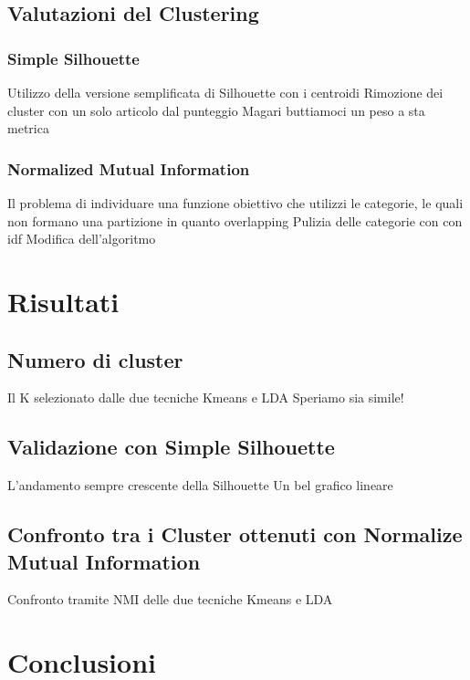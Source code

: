 \documentclass[
12pt, %
a4paper, %
oneside, %
headinclude,footinclude, %
BCOR5mm, %
]{scrartcl}
\begin{document}
	\subsection{Valutazioni del Clustering}

		\subsubsection{Simple Silhouette}

			Utilizzo della versione semplificata di Silhouette con i centroidi
			Rimozione dei cluster con un solo articolo dal punteggio
			Magari buttiamoci un peso a sta metrica

		\subsubsection{Normalized Mutual Information}

			Il problema di individuare una funzione obiettivo che utilizzi le categorie,
			le quali non formano una partizione in quanto overlapping
			Pulizia delle categorie con con idf
			Modifica dell'algoritmo



\section{Risultati}

	\subsection{Numero di cluster}

		Il K selezionato dalle due tecniche Kmeans e LDA
		Speriamo sia simile!

	\subsection{Validazione con Simple Silhouette}

		L'andamento sempre crescente della Silhouette
		Un bel grafico lineare

	\subsection{Confronto tra i Cluster ottenuti con Normalize Mutual Information}

		Confronto tramite NMI delle due tecniche Kmeans e LDA


\section{Conclusioni}
\end{document}
